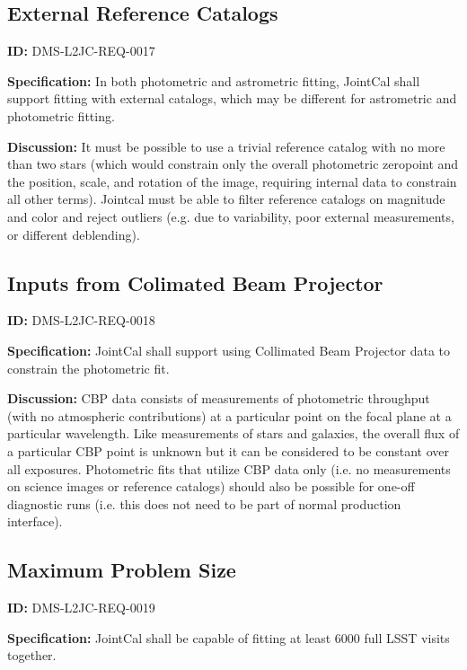 \documentclass[SE,toc,lsstdraft]{lsstdoc}
\begin{document}
\subsection{External Reference Catalogs}

\label{DMS-L2JC-REQ-0017}
\textbf{ID:} DMS-L2JC-REQ-0017

\textbf{Specification:}
In both photometric and astrometric fitting, JointCal shall support fitting with external catalogs, which may be different for astrometric and photometric fitting.

\textbf{Discussion:}
It must be possible to use a trivial reference catalog with no more than two stars (which would constrain only the overall photometric zeropoint and the position, scale, and rotation of the image, requiring internal data to constrain all other terms).  Jointcal must be able to filter reference catalogs on magnitude and color and reject outliers (e.g. due to variability, poor external measurements, or different deblending).

\subsection{Inputs from Colimated Beam Projector}

\label{DMS-L2JC-REQ-0018}
\textbf{ID:} DMS-L2JC-REQ-0018

\textbf{Specification:}
JointCal shall support using Collimated Beam Projector data to constrain the photometric fit.

\textbf{Discussion:}
CBP data consists of measurements of photometric throughput (with no atmospheric contributions) at a particular point on the focal plane at a particular wavelength. Like measurements of stars and galaxies, the overall flux of a particular CBP point is unknown but it can be considered to be constant over all exposures. Photometric fits that utilize CBP data only (i.e. no measurements on science images or reference catalogs) should also be possible for one-off diagnostic runs (i.e. this does not need to be part of normal production interface).

\subsection{Maximum Problem Size}

\label{DMS-L2JC-REQ-0019}
\textbf{ID:} DMS-L2JC-REQ-0019

\textbf{Specification:}
JointCal shall be capable of fitting at least 6000 full LSST visits together.
\end{document}

